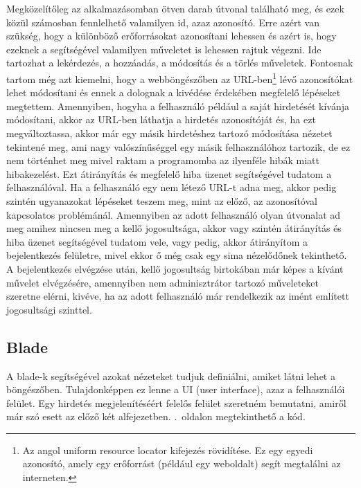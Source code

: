 \documentclass[]{thesis-ekf}
\theoremstyle{definition}
\theoremstyle{remark}
\begin{document}
		Megközelítőleg az alkalmazásomban ötven darab útvonal található meg, és ezek közül számosban fennlelhető valamilyen id, azaz azonosító. Erre azért van szükség, hogy a különböző erőforrásokat azonosítani lehessen és azért is, hogy ezeknek a segítségével valamilyen műveletet is lehessen rajtuk végezni. Ide tartozhat a lekérdezés, a hozzáadás, a módosítás és a törlés műveletek. Fontosnak tartom még azt kiemelni, hogy a webböngészőben az URL-ben\footnote{Az angol uniform resource locator kifejezés rövidítése. Ez egy egyedi azonosító, amely egy erőforrást (például egy weboldalt) segít megtalálni az interneten.} lévő azonosítókat lehet módosítani és ennek a dolognak a kivédése érdekében megfelelő lépéseket megtettem. Amennyiben, hogyha a felhasználó például a saját hirdetését kívánja módosítani, akkor az URL-ben láthatja a hirdetés azonosítóját és, ha ezt megváltoztassa, akkor már egy másik hirdetéshez tartozó módosítása nézetet tekintené meg, ami nagy valószínűséggel egy másik felhasználóhoz tartozik, de ez nem történhet meg mivel raktam a programomba az ilyenféle hibák miatt hibakezelést. Ezt átirányítás és megfelelő hiba üzenet segítségével tudatom a felhasználóval. Ha a felhasználó egy nem létező URL-t adna meg, akkor pedig szintén ugyanazokat lépéseket teszem meg, mint az előző, az azonosítóval kapcsolatos problémánál. Amennyiben az adott felhasználó olyan útvonalat ad meg amihez nincsen meg a kellő jogosultsága, akkor vagy szintén átirányítás és hiba üzenet segítségével tudatom vele, vagy pedig, akkor átirányítom a bejelentkezés felületre, mivel ekkor ő még csak egy sima nézelődőnek tekinthető. A bejelentkezés elvégzése után, kellő jogosultság birtokában már képes a kívánt művelet elvégzésére, amennyiben nem adminisztrátor tartozó műveleteket szeretne elérni, kivéve, ha az adott felhasználó már rendelkezik az imént említett jogosultsági szinttel.
	
	\subsection{Blade}\label{sc-blade}
		A blade-k segítségével azokat nézeteket tudjuk definiálni, amiket látni lehet a böngészőben. Tulajdonképpen ez lenne a UI (user interface), azaz a felhasználói felület. Egy hirdetés megjelenítéséért felelős felület szeretném bemutatni, amiről már szó esett az előző két alfejezetben. \Az{\pageref{kod-blade}}.~oldalon megtekinthető a kód.
	
\end{document}
